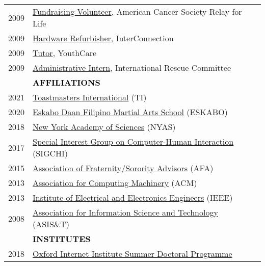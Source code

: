 \documentclass[11pt]{article}
\begin{document}
{{\begin{longtable}{Rp{0.75in}p{5.0in}}
\footnotesize{2009} & \href{https://www.cancer.org/involved/fundraise/relay-for-life.html}{{Fundraising Volunteer}}, American Cancer Society Relay for Life\\

\footnotesize{2009} & \href{http://www.washington.edu/news/2010/04/22/student-service-and-leadership-to-be-celebrated-april-28/}{{Hardware Refurbisher}}, InterConnection\\

\footnotesize{2009} & \href{https://youthcare.org}{{Tutor}}, YouthCare\\

\footnotesize{2009} & \href{https://www.rescue.org}{{Administrative Intern}}, International Rescue Committee\\

& \textcolor{black}{\uppercase{\textbf{Affiliations}}}\\
\footnotesize{2021} & \href{https://www.toastmasters.org/}{{Toastmasters International}} (TI)\\

\footnotesize{2020} & \href{https://www.eskabodaan.org/}{{Eskabo Daan Filipino Martial Arts School}} (ESKABO)\\

\footnotesize{2018} & \href{https://www.nyas.org/}{{New York Academy of Sciences}} (NYAS)\\

\footnotesize{2017} & \href{https://www.sigchi.org/}{{Special Interest Group on Computer-Human Interaction}} (SIGCHI)\\

\footnotesize{2015} & \href{https://www.acm.org/}{{Association of Fraternity/Sorority Advisors}} (AFA)\\

\footnotesize{2013} & \href{https://www.acm.org/}{{Association for Computing Machinery}} (ACM)\\

\footnotesize{2013} & \href{https://www.ieee.org/}{{Institute of Electrical and Electronics Engineers}} (IEEE)\\

\footnotesize{2008} & \href{https://www.asist.org/}{{Association for Information Science and Technology}} (ASIS\&T) \\

& \textcolor{black}{\uppercase{\textbf{Institutes}}}\\

\footnotesize{2018} & \href{https://www.oii.ox.ac.uk/study/summer-doctoral-programme/alumni/}{{Oxford Internet Institute Summer Doctoral Programme}}\\


\end{longtable}}}
\end{document}
